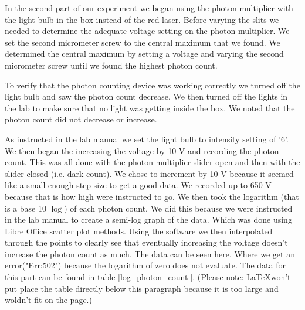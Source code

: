 \documentclass[12pt letterpaper]{article}
\begin{document}
In the second part of our experiment we began using the photon multiplier with the light bulb in the box instead of the red laser. Before varying the slits we needed to determine the adequate voltage setting on the photon multiplier. We set the second micrometer screw to the central maximum that we found. We determined the central maximum by setting a voltage and varying the second micrometer screw until we found the highest photon count. 

To verify that the photon counting device was working correctly we turned off the light bulb and saw the photon count decrease. We then turned off the lights in the lab to make sure that no light was getting inside the box. We noted that the photon count did not decrease or increase. 

As instructed in the lab manual we set the light bulb to intensity setting of '6'. We then began the increasing the voltage by 10 V and recording the photon count. This was all done with the photon multiplier slider open and then with the slider closed (i.e. dark count). We chose to increment by 10 V because it seemed like a small enough step size to get a good data. We recorded up to 650 V because that is how high were instructed to go. We then took the logarithm (that is a base 10 $\log$) of each photon count. We did this because we were instructed in the lab manual to create a semi-log graph of the data. Which was done using Libre Office scatter plot methods. Using the software we then interpolated through the points to clearly see that eventually increasing the voltage doesn't increase the photon count as much. The data can be seen here. Where we get an error("Err:502") because the logarithm of zero does not evaluate. The data for this part can be found in table \ref{log_photon_count]}. (Please note: \LaTeX won't put place the table directly below this paragraph because it is too large and woldn't fit on the page.)
\end{document}
